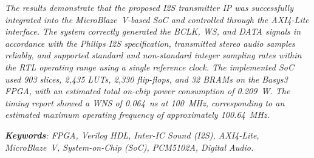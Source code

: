 \hspace{1cm}\textit{The results demonstrate that the proposed I2S transmitter IP was successfully integrated into the MicroBlaze~V-based SoC and controlled through the AXI4-Lite interface. The system correctly generated the BCLK, WS, and DATA signals in accordance with the Philips I2S specification, transmitted stereo audio samples reliably, and supported standard and non-standard integer sampling rates within the RTL operating range using a single reference clock. The implemented SoC used 903 slices, 2,435 LUTs, 2,330 flip-flops, and 32 BRAMs on the Basys3 FPGA, with an estimated total on-chip power consumption of 0.209~W. The timing report showed a WNS of 0.064~ns at 100~MHz, corresponding to an estimated maximum operating frequency of approximately 100.64~MHz.}
\par\vspace{0.8em}

\noindent\textit{\textbf{Keywords}: FPGA, Verilog HDL, Inter-IC Sound (I2S), AXI4-Lite, MicroBlaze~V, System-on-Chip (SoC), PCM5102A, Digital Audio.}
